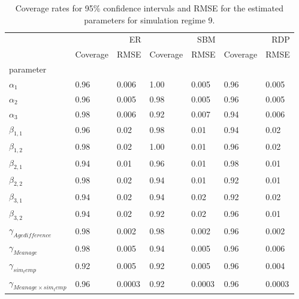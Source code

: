 \begin{table}[ht]
\centering
\caption{Coverage rates for 95\% confidence intervals and RMSE for the estimated parameters for simulation regime 9.}
\label{tab:regime_9_params}
\begin{tabular}{lllllll}
\toprule
 & \multicolumn{2}{r}{ER} & \multicolumn{2}{r}{SBM} & \multicolumn{2}{r}{RDP} \\
 & Coverage & RMSE & Coverage & RMSE & Coverage & RMSE \\
parameter &  &  &  &  &  &  \\
\midrule
$\alpha_{1}$ & 0.96 & 0.006 & 1.00 & 0.005 & 0.96 & 0.005 \\
$\alpha_{2}$ & 0.96 & 0.005 & 0.98 & 0.005 & 0.96 & 0.005 \\
$\alpha_{3}$ & 0.98 & 0.006 & 0.92 & 0.007 & 0.94 & 0.006 \\
$\beta_{1,1}$ & 0.96 & 0.02 & 0.98 & 0.01 & 0.94 & 0.02 \\
$\beta_{1,2}$ & 0.98 & 0.02 & 1.00 & 0.01 & 0.96 & 0.02 \\
$\beta_{2,1}$ & 0.94 & 0.01 & 0.96 & 0.01 & 0.98 & 0.01 \\
$\beta_{2,2}$ & 0.98 & 0.02 & 0.94 & 0.01 & 0.92 & 0.01 \\
$\beta_{3,1}$ & 0.94 & 0.02 & 0.94 & 0.02 & 0.92 & 0.02 \\
$\beta_{3,2}$ & 0.94 & 0.02 & 0.92 & 0.02 & 0.96 & 0.01 \\
$\gamma_{Age difference}$ & 0.98 & 0.002 & 0.98 & 0.002 & 0.96 & 0.002 \\
$\gamma_{Mean age}$ & 0.98 & 0.005 & 0.94 & 0.005 & 0.96 & 0.006 \\
$\gamma_{sim_temp}$ & 0.92 & 0.005 & 0.92 & 0.005 & 0.96 & 0.004 \\
$\gamma_{Mean age\times sim_temp}$ & 0.96 & 0.0003 & 0.92 & 0.0003 & 0.96 & 0.0003 \\
\bottomrule
\end{tabular}

\end{table}
